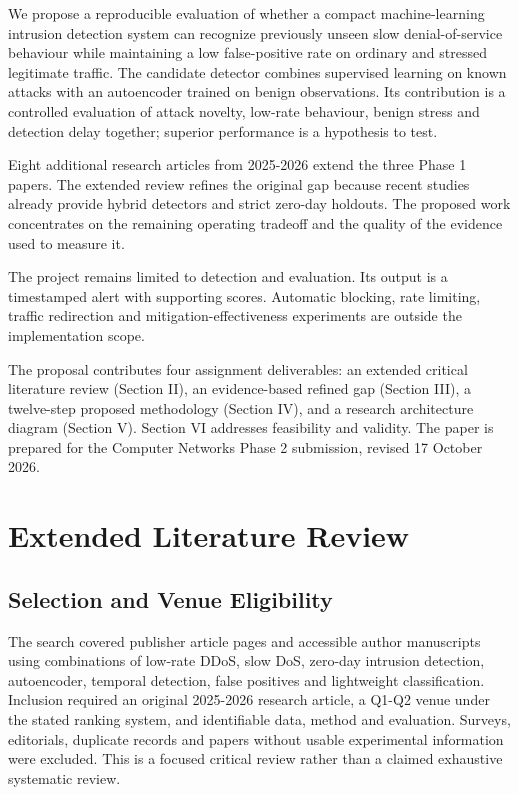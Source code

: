 \documentclass[conference]{IEEEtran}
\begin{document}
We propose a reproducible evaluation of whether a compact machine-learning intrusion detection system can recognize previously unseen slow denial-of-service behaviour while maintaining a low false-positive rate on ordinary and stressed legitimate traffic. The candidate detector combines supervised learning on known attacks with an autoencoder trained on benign observations. Its contribution is a controlled evaluation of attack novelty, low-rate behaviour, benign stress and detection delay together; superior performance is a hypothesis to test.

Eight additional research articles from 2025-2026 extend the three Phase 1 papers. The extended review refines the original gap because recent studies already provide hybrid detectors and strict zero-day holdouts. The proposed work concentrates on the remaining operating tradeoff and the quality of the evidence used to measure it.

The project remains limited to detection and evaluation. Its output is a timestamped alert with supporting scores. Automatic blocking, rate limiting, traffic redirection and mitigation-effectiveness experiments are outside the implementation scope.

The proposal contributes four assignment deliverables: an extended critical literature review (Section II), an evidence-based refined gap (Section III), a twelve-step proposed methodology (Section IV), and a research architecture diagram (Section V). Section VI addresses feasibility and validity. The paper is prepared for the Computer Networks Phase 2 submission, revised 17 October 2026.

\section{Extended Literature Review}
\label{sec:review}
\subsection{Selection and Venue Eligibility}
The search covered publisher article pages and accessible author manuscripts using combinations of low-rate DDoS, slow DoS, zero-day intrusion detection, autoencoder, temporal detection, false positives and lightweight classification. Inclusion required an original 2025-2026 research article, a Q1-Q2 venue under the stated ranking system, and identifiable data, method and evaluation. Surveys, editorials, duplicate records and papers without usable experimental information were excluded. This is a focused critical review rather than a claimed exhaustive systematic review.
\end{document}
